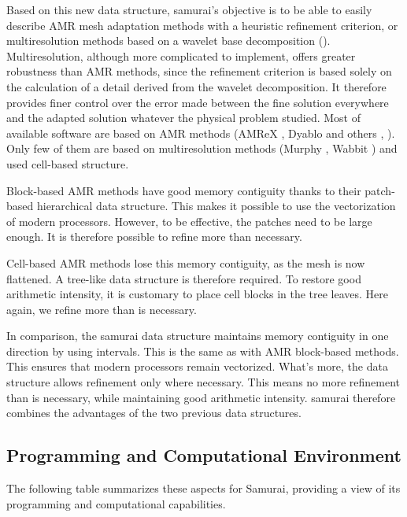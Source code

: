 Based on this new data structure, samurai's objective is to be able to easily describe AMR mesh adaptation methods with a heuristic refinement criterion, or multiresolution methods based on a wavelet base decomposition (\cite{cohen_fully_2003}). Multiresolution, although more complicated to implement, offers greater robustness than AMR methods, since the refinement criterion is based solely on the calculation of a detail derived from the wavelet decomposition. It therefore provides finer control over the error made between the fine solution everywhere and the adapted solution whatever the physical problem studied. Most of available software are based on AMR methods (AMReX \cite{zhang_amrex_2021}, Dyablo \cite{delorme_novel_2022} and others , \cite{dubey_survey_2014}). Only few of them are based on multiresolution methods (Murphy \cite{gillis_murphy---scalable_2022}, Wabbit \cite{krah_wavelet_2022}) and used cell-based structure.

Block-based AMR methods have good memory contiguity thanks to their patch-based hierarchical data structure. This makes it possible to use the vectorization of modern processors. However, to be effective, the patches need to be large enough. It is therefore possible to refine more than necessary.

Cell-based AMR methods lose this memory contiguity, as the mesh is now flattened. A tree-like data structure is therefore required. To restore good arithmetic intensity, it is customary to place cell blocks in the tree leaves. Here again, we refine more than is necessary.

In comparison, the samurai data structure maintains memory contiguity in one direction by using intervals. This is the same as with AMR block-based methods. This ensures that modern processors remain vectorized. What's more, the data structure allows refinement only where necessary. This means no more refinement than is necessary, while maintaining good arithmetic intensity. samurai therefore combines the advantages of the two previous data structures.

\subsection{Programming and Computational Environment}
\label{sec::Samurai:environment_capabilities}


The following table summarizes these aspects for Samurai, providing a  view of its programming and computational capabilities.

